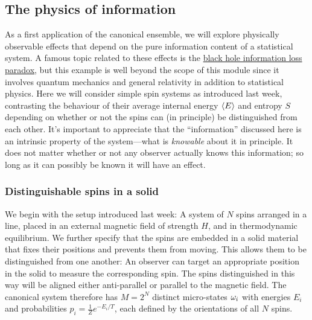\subsection{The physics of information}
As a first application of the canonical ensemble, we will explore physically observable effects that depend on the pure information content of a statistical system.
A famous topic related to these effects is the \href{https://en.wikipedia.org/wiki/Black_hole_information_paradox}{black hole information loss paradox}, but this example is well beyond the scope of this module since it involves quantum mechanics and general relativity in addition to statistical physics.
Here we will consider simple spin systems as introduced last week, contrasting the behaviour of their average internal energy $\left\langle E \right\rangle$ and entropy $S$ depending on whether or not the spins can (in principle) be distinguished from each other.
It's important to appreciate that the ``information'' discussed here is an intrinsic property of the system---what is \textit{knowable} about it in principle.
It does not matter whether or not any observer actually knows this information; so long as it can possibly be known it will have an effect.

\subsubsection{Distinguishable spins in a solid}
We begin with the setup introduced last week: A system of $N$ spins arranged in a line, placed in an external magnetic field of strength $H$, and in thermodynamic equilibrium.
We further specify that the spins are embedded in a solid material that fixes their positions and prevents them from moving.
This allows them to be distinguished from one another: An observer can target an appropriate position in the solid to measure the corresponding spin.
The spins distinguished in this way will be aligned either anti-parallel or parallel to the magnetic field.
The canonical system therefore has $M = 2^N$ distinct micro-states $\omega_i$ with energies $E_i$ and probabilities $p_i = \frac{1}{Z} e^{-E_i / T}$, each defined by the orientations of all $N$ spins.

